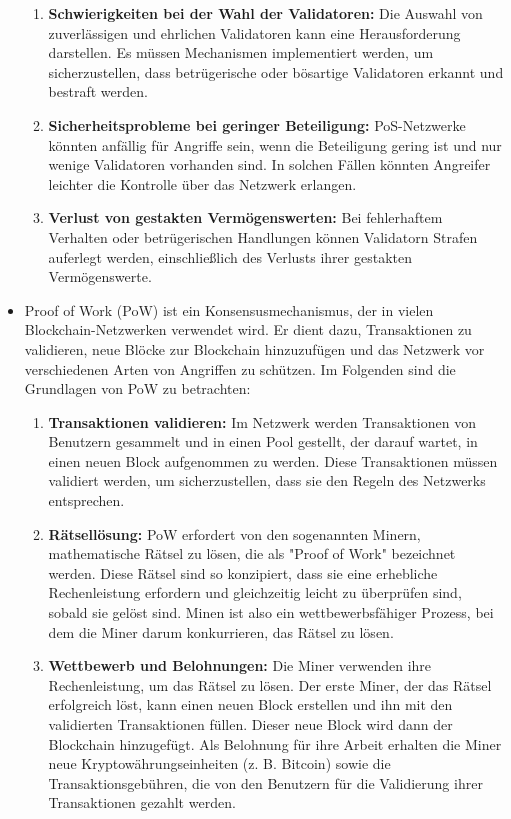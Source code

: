 \begin{itemize}
\begin{enumerate}
		\item \textbf{Schwierigkeiten bei der Wahl der Validatoren:} Die Auswahl von zuverlässigen und ehrlichen Validatoren kann eine Herausforderung darstellen. Es müssen Mechanismen implementiert werden, um sicherzustellen, dass betrügerische oder bösartige Validatoren erkannt und bestraft werden.
		
		\item \textbf{Sicherheitsprobleme bei geringer Beteiligung:} PoS-Netzwerke könnten anfällig für Angriffe sein, wenn die Beteiligung gering ist und nur wenige Validatoren vorhanden sind. In solchen Fällen könnten Angreifer leichter die Kontrolle über das Netzwerk erlangen.
		
		\item \textbf{Verlust von gestakten Vermögenswerten:} Bei fehlerhaftem Verhalten oder betrügerischen Handlungen können Validatorn Strafen auferlegt werden, einschließlich des Verlusts ihrer gestakten Vermögenswerte.
	\end{enumerate}
	
	\item Proof of Work (PoW) ist ein Konsensusmechanismus, der in vielen Blockchain-Netzwerken verwendet wird. Er dient dazu, Transaktionen zu validieren, neue Blöcke zur Blockchain hinzuzufügen und das Netzwerk vor verschiedenen Arten von Angriffen zu schützen. Im Folgenden sind die Grundlagen von PoW zu betrachten:
	
	\begin{enumerate}[label=\arabic*.]
		\item \textbf{Transaktionen validieren:} Im Netzwerk werden Transaktionen von Benutzern gesammelt und in einen Pool gestellt, der darauf wartet, in einen neuen Block aufgenommen zu werden. Diese Transaktionen müssen validiert werden, um sicherzustellen, dass sie den Regeln des Netzwerks entsprechen.
		
		\item \textbf{Rätsellösung:} PoW erfordert von den sogenannten Minern, mathematische Rätsel zu lösen, die als "Proof of Work" bezeichnet werden. Diese Rätsel sind so konzipiert, dass sie eine erhebliche Rechenleistung erfordern und gleichzeitig leicht zu überprüfen sind, sobald sie gelöst sind. Minen ist also ein wettbewerbsfähiger Prozess, bei dem die Miner darum konkurrieren, das Rätsel zu lösen.
		
		\item \textbf{Wettbewerb und Belohnungen:} Die Miner verwenden ihre Rechenleistung, um das Rätsel zu lösen. Der erste Miner, der das Rätsel erfolgreich löst, kann einen neuen Block erstellen und ihn mit den validierten Transaktionen füllen. Dieser neue Block wird dann der Blockchain hinzugefügt. Als Belohnung für ihre Arbeit erhalten die Miner neue Kryptowährungseinheiten (z. B. Bitcoin) sowie die Transaktionsgebühren, die von den Benutzern für die Validierung ihrer Transaktionen gezahlt werden.
		

\end{enumerate}
\end{itemize}
